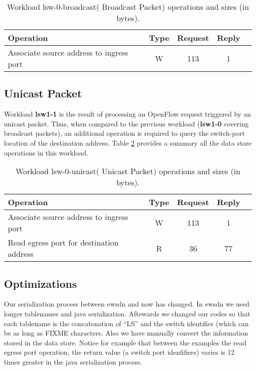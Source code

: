 \documentclass[12pt,openright,twoside]{report}
\begin{document}
\begin{table}[ht]
\centering 
\begin{tabular}{l c c c c}
 Operation & Type & Request & Reply \\ \toprule 
 Associate source address to ingress port & W & 113 & 1 \\ \bottomrule
\end{tabular}
\caption[Workload lsw-0-broadcast( Broadcast Packet) operations]{Workload lsw-0-broadcast( Broadcast Packet) operations and sizes (in bytes).}
\label{table:lsw0:broadcast}
\end{table}

\subsection{Unicast Packet}
Workload \textbf{lsw1-1} is the result of processing an OpenFlow request
triggered by an unicast packet. Thus,  when compared to the previous
workload (\textbf{lsw1-0} covering broadcast packets), an additional
operation is required to query the switch-port location of the
destination address. Table \ref{table:lsw0:unicast} provides a summary all the data
store operations in this workload. 

\begin{table}[ht]
\centering 
\begin{tabular}{l c c c c}
 Operation & Type & Request & Reply  \\ \toprule 
 Associate source address to ingress port & W & 113 & 1\\\midrule
Read egress port for destination address & R & 36 & 77 \\\bottomrule
\end{tabular}
\caption[Workload lsw-0-unicast( Unicast Packet) operations]{Workload lsw-0-unicast( Unicast Packet) operations and sizes (in bytes).}
\label{table:lsw0:unicast}
\end{table}

\subsection{Optimizations}
Our serialization process between ewsdn and now has changed. In ewsdn we used longer tablenames and java serialization. Aftewards we changed our codes so that each tablename is the concatenation of ``LS''  and the switch identifier (which can be as long as FIXME characters.  Also we have manually convert the information stored in the data store. Notice for example that between the examples the read egress port operation, the return value (a switch port idenfifiers) varies is 12 times greater in the java serialization process. 
\end{document}
